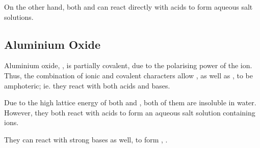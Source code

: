 
			On the other hand, both  and  can react directly with acids to form aqueous salt solutions.




		\pagebreak
		\subsection{Aluminium Oxide}

			Aluminium oxide, , is partially covalent, due to the polarising power of the  ion. Thus, the combination of
			ionic and covalent characters allow , as well as , to be amphoteric; ie. they react with both acids and
			bases.

			Due to the high lattice energy of both  and , both of them are insoluble in water. However, they both react
			with acids to form an aqueous salt solution containing  ions.


			They can react with strong bases as well, to form , \ch{[\Al(OH)4]-}.


